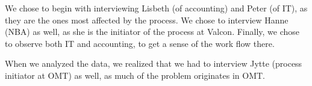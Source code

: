 We chose to begin with interviewing Lisbeth (of accounting) and Peter (of IT), as they are the ones most affected by the process.
We chose to interview Hanne (NBA) as well, as she is the initiator of the process at Valcon.
Finally, we chose to observe both IT and accounting, to get a sense of the work flow there.

When we analyzed the data, we realized that we had to interview Jytte (process initiator at OMT) as well, as much of the problem originates in OMT.


